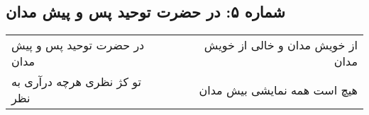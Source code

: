 \begin{center}
\section*{شماره ۵: در حضرت توحید پس و پیش مدان}
\label{sec:005}
\begin{longtable}{l p{0.5cm} r}
در حضرت توحید پس و پیش مدان
&&
از خویش مدان و خالی از خویش مدان
\\
تو کژ نظری هرچه درآری به نظر
&&
هیچ است همه نمایشی بیش مدان
\\
\end{longtable}
\end{center}
